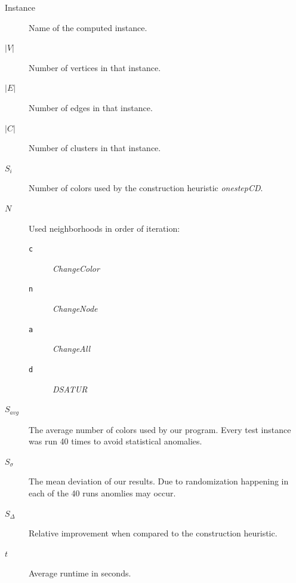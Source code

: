 \documentclass[paper = a4, fontsize = 10pt]{scrartcl}
\begin{document}
\begin{description}
    \item[Instance] Name of the computed instance.
    \item[$|V|$] Number of vertices in that instance.
    \item[$|E|$] Number of edges in that instance.
    \item[$|C|$] Number of clusters in that instance.
    \item[$S_i$] Number of colors used by the construction heuristic \emph{onestepCD}.
    \item[$N$] Used neighborhoods in order of iteration:
        \begin{description}
            \item[\texttt{c}] \emph{ChangeColor}
            \item[\texttt{n}] \emph{ChangeNode}
            \item[\texttt{a}] \emph{ChangeAll}
            \item[\texttt{d}] \emph{DSATUR}
        \end{description}
    \item[$S_{avg}$] The average number of colors used by our program. Every test instance was run 40 times to avoid statistical anomalies.
    \item[$S_{\sigma}$] The mean deviation of our results. Due to randomization happening in each of the 40 runs anomlies may occur.
    \item[$S_{\Delta}$] Relative improvement when compared to the construction heuristic.
    \item[$t$] Average runtime in seconds.
\end{description}
\end{document}
